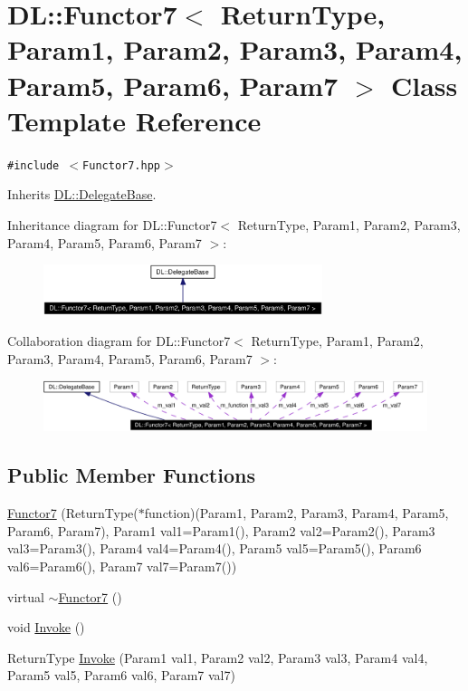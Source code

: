 \hypertarget{classDL_1_1Functor7}{
\section{DL::Functor7$<$ Return\-Type, Param1, Param2, Param3, Param4, Param5, Param6, Param7 $>$ Class Template Reference}
\label{classDL_1_1Functor7}
}
{\tt \#include $<$Functor7.hpp$>$}

Inherits \hyperlink{classDL_1_1DelegateBase}{DL::Delegate\-Base}.

Inheritance diagram for DL::Functor7$<$ Return\-Type, Param1, Param2, Param3, Param4, Param5, Param6, Param7 $>$:\begin{figure}[H]
\begin{center}
\leavevmode
\includegraphics[width=231pt]{classDL_1_1Functor7__inherit__graph}
\end{center}
\end{figure}
Collaboration diagram for DL::Functor7$<$ Return\-Type, Param1, Param2, Param3, Param4, Param5, Param6, Param7 $>$:\begin{figure}[H]
\begin{center}
\leavevmode
\includegraphics[width=355pt]{classDL_1_1Functor7__coll__graph}
\end{center}
\end{figure}
\subsection*{Public Member Functions}
\begin{CompactItemize}
\item 
\hyperlink{classDL_1_1Functor7_a0}{Functor7} (Return\-Type($\ast$function)(Param1, Param2, Param3, Param4, Param5, Param6, Param7), Param1 val1=Param1(), Param2 val2=Param2(), Param3 val3=Param3(), Param4 val4=Param4(), Param5 val5=Param5(), Param6 val6=Param6(), Param7 val7=Param7())
\item 
virtual \hyperlink{classDL_1_1Functor7_a1}{$\sim$Functor7} ()
\item 
void \hyperlink{classDL_1_1Functor7_a2}{Invoke} ()
\item 
Return\-Type \hyperlink{classDL_1_1Functor7_a3}{Invoke} (Param1 val1, Param2 val2, Param3 val3, Param4 val4, Param5 val5, Param6 val6, Param7 val7)
\end{CompactItemize}
